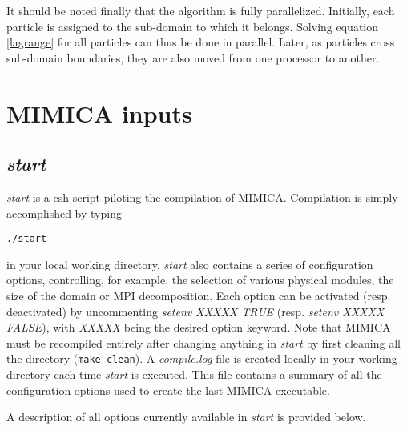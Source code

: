 \documentclass[12pt,A4,french]{article}
\begin{document}
It should be noted finally that the algorithm is fully parallelized. Initially, each particle is assigned to the sub-domain to which it belongs. Solving equation \ref{lagrange} for all particles can thus be done in parallel. Later, as particles cross sub-domain boundaries, they are also moved from one processor to another.

\newpage
\section{MIMICA inputs}
\label{inputs}

\subsection{{\it start}}

{\it start} is a csh script piloting the compilation of MIMICA. Compilation is simply accomplished by typing

\begin{verbatim}
./start
\end{verbatim}

in your local working directory. {\it start} also contains a series of configuration options, controlling, for example, the selection of various physical modules, the size of the domain or MPI decomposition. Each option can be activated (resp. deactivated) by uncommenting {\it setenv XXXXX TRUE} (resp. {\it setenv XXXXX FALSE}), with {\it XXXXX} being the desired option keyword. Note that MIMICA must be recompiled entirely after changing anything in {\it start} by first cleaning all the directory (\verb?make clean?). A {\it compile.log} file is created locally in your working directory each time {\it start} is executed. This file contains a summary of all the configuration options used to create the last MIMICA executable.

A description of all options currently available in {\it start} is provided below.
\end{document}
